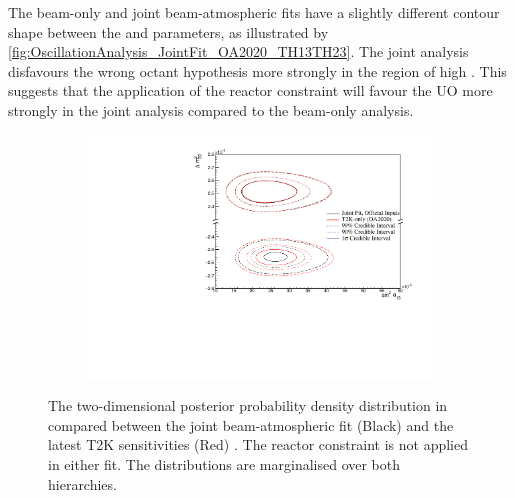 The beam-only and joint beam-atmospheric fits have a slightly different contour shape between the  and  parameters, as illustrated by \autoref{fig:OscillationAnalysis_JointFit_OA2020_TH13TH23}. The joint analysis disfavours the wrong octant hypothesis more strongly in the region of high . This suggests that the application of the reactor constraint will favour the UO more strongly in the joint analysis compared to the beam-only analysis.

\begin{figure}[h]
  \begin{subfigure}[t]{0.98\textwidth}
    \includegraphics[width=\textwidth, trim={0mm 0mm 0mm 0mm}, clip,page=1]{Figures/OA/JointFit_OA2020_Comp/ContourComparison_2D_th13_dm32_BH_0_woRC_UnSmeared_CredibleInterval.pdf}
  \end{subfigure}
  \caption{The two-dimensional posterior probability density distribution in  compared between the joint beam-atmospheric fit (Black) and the latest T2K sensitivities (Red) \cite{t2k_tn_399}. The reactor constraint is not applied in either fit. The distributions are marginalised over both hierarchies.}
  \label{fig:OscillationAnalysis_JointFit_OA2020_DM32TH13}
\end{figure}

